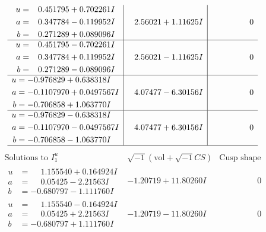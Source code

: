 \documentclass[1p]{elsarticle_modified}
\theoremstyle{definition}
\newcommand{\I}{\sqrt{-1}}
\begin{document}
$$\begin{array}{c|c|c}
\begin{aligned}
u &= \phantom{-}0.451795 + 0.702261 I \\
a &= \phantom{-}0.347784 - 0.119952 I \\
b &= \phantom{-}0.271289 + 0.089096 I\end{aligned}
 & \phantom{-}2.56021 + 1.11625 I & \phantom{-0.000000 } 0 \\ \hline\begin{aligned}
u &= \phantom{-}0.451795 - 0.702261 I \\
a &= \phantom{-}0.347784 + 0.119952 I \\
b &= \phantom{-}0.271289 - 0.089096 I\end{aligned}
 & \phantom{-}2.56021 - 1.11625 I & \phantom{-0.000000 } 0 \\ \hline\begin{aligned}
u &= -0.976829 + 0.638318 I \\
a &= -0.1107970 + 0.0497567 I \\
b &= -0.706858 + 1.063770 I\end{aligned}
 & \phantom{-}4.07477 - 6.30156 I & \phantom{-0.000000 } 0 \\ \hline\begin{aligned}
u &= -0.976829 - 0.638318 I \\
a &= -0.1107970 - 0.0497567 I \\
b &= -0.706858 - 1.063770 I\end{aligned}
 & \phantom{-}4.07477 + 6.30156 I & \phantom{-0.000000 } 0\\
 \hline 
 \end{array}$$\newpage$$\begin{array}{c|c|c}  
\text{Solutions to }I^u_{1}& \I (\text{vol} + \sqrt{-1}CS) & \text{Cusp shape}\\
 \hline 
\begin{aligned}
u &= \phantom{-}1.155540 + 0.164924 I \\
a &= \phantom{-}0.05425 - 2.21563 I \\
b &= -0.680797 - 1.111760 I\end{aligned}
 & -1.20719 + 11.80260 I & \phantom{-0.000000 } 0 \\ \hline\begin{aligned}
u &= \phantom{-}1.155540 - 0.164924 I \\
a &= \phantom{-}0.05425 + 2.21563 I \\
b &= -0.680797 + 1.111760 I\end{aligned}
 & -1.20719 - 11.80260 I & \phantom{-0.000000 } 0 \\ \hline\begin{aligned}

\end{aligned}
\end{array}$$
\end{document}
